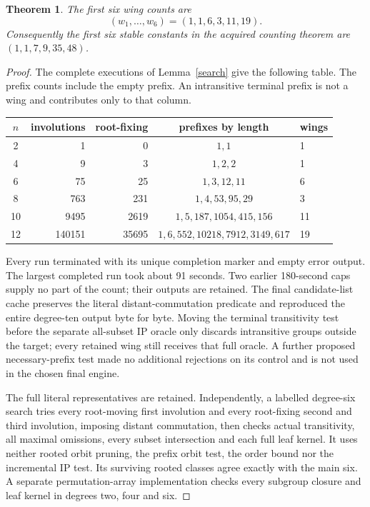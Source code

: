 \documentclass[11pt,a4paper]{article}
\newtheorem{theorem}{Theorem}\newtheorem{lemma}[theorem]{Lemma}
\begin{document}
\begin{theorem}\label{finite}
The first six wing counts are
\[
                    (w_1,\ldots,w_6)=(1,1,6,3,11,19).
\]
Consequently the first six stable constants in the acquired counting
theorem are $(1,1,7,9,35,48)$.
\end{theorem}
\begin{proof}
The complete executions of Lemma~\ref{search} give the following table.
The prefix counts include the empty prefix. An intransitive terminal
prefix is not a wing and contributes only to that column.
\begin{center}\small
\begin{tabular}{crrcl}
\toprule
$n$ & involutions & root-fixing & prefixes by length & wings\\
\midrule
2&1&0&$1,1$&1\\
4&9&3&$1,2,2$&1\\
6&75&25&$1,3,12,11$&6\\
8&763&231&$1,4,53,95,29$&3\\
10&9495&2619&$1,5,187,1054,415,156$&11\\
12&140151&35695&$1,6,552,10218,7912,3149,617$&19\\
\bottomrule
\end{tabular}\end{center}
Every run terminated with its unique completion marker and empty error
output. The largest completed run took about 91 seconds. Two earlier
180-second caps supply no part of the count; their outputs are retained.
The final candidate-list cache preserves the literal distant-commutation
predicate and reproduced the entire degree-ten output byte for byte.
Moving the terminal transitivity test before the separate all-subset IP
oracle only discards intransitive groups outside the target; every
retained wing still receives that full oracle. A further proposed
necessary-prefix test made no additional rejections on its control and
is not used in the chosen final engine.

The full literal representatives are retained. Independently, a labelled
degree-six search tries every root-moving first involution and every
root-fixing second and third involution, imposing distant commutation,
then checks actual transitivity, all maximal omissions, every subset
intersection and each full leaf kernel. It uses neither rooted orbit
pruning, the prefix orbit test, the order bound nor the incremental IP
test. Its surviving rooted classes agree exactly with the main six.
A separate permutation-array implementation checks every subgroup closure
and leaf kernel in degrees two, four and six.


\end{proof}
\end{document}
